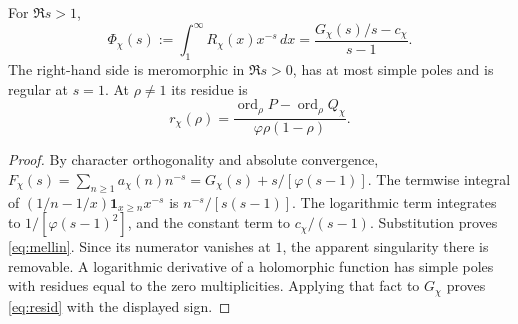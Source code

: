 \documentclass[11pt,a4paper]{article}
\begin{document}
\begin{proposition}\label{prop:mellin}
For $\Re s>1$,
\begin{equation}\label{eq:mellin}
\Phi_\chi(s):=\int_1^\infty R_\chi(x)x^{-s}\,dx=\frac{G_\chi(s)/s-c_\chi}{s-1}.
\end{equation}
The right-hand side is meromorphic in $\Re s>0$, has at most simple poles and is regular at $s=1$. At $\rho\ne1$ its residue is
\begin{equation}\label{eq:resid}
r_\chi(\rho)=\frac{\operatorname{ord}_\rho P-\operatorname{ord}_\rho Q_\chi}{\varphi\rho(1-\rho)}.
\end{equation}
\end{proposition}
\begin{proof}
By character orthogonality and absolute convergence, $F_\chi(s)=\sum_{n\geq1}a_\chi(n)n^{-s}=G_\chi(s)+s/[\varphi(s-1)]$. The termwise integral of $(1/n-1/x)\mathbf1_{x\geq n}x^{-s}$ is $n^{-s}/[s(s-1)]$. The logarithmic term integrates to $1/[\varphi(s-1)^2]$, and the constant term to $c_\chi/(s-1)$. Substitution proves \eqref{eq:mellin}. Since its numerator vanishes at $1$, the apparent singularity there is removable. A logarithmic derivative of a holomorphic function has simple poles with residues equal to the zero multiplicities. Applying that fact to $G_\chi$ proves \eqref{eq:resid} with the displayed sign.
\end{proof}
\end{document}
